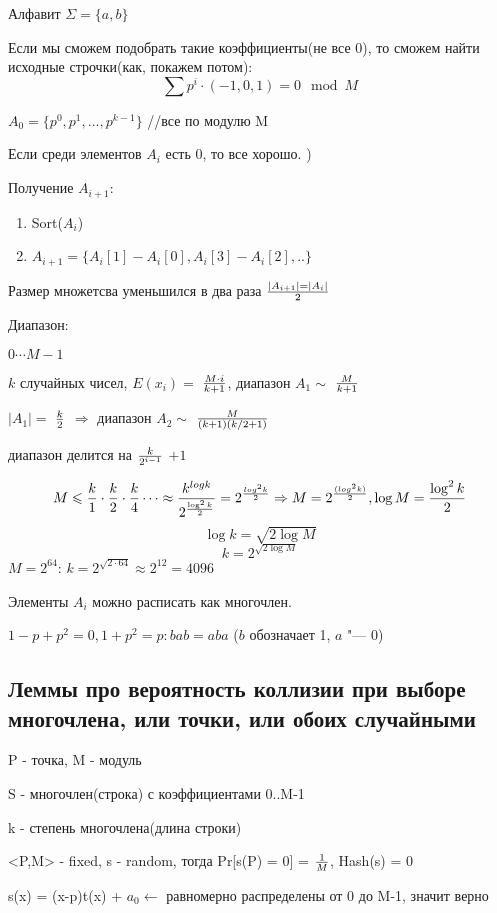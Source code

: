 Алфавит $\Sigma = \{a,b\}$ 

Если мы сможем подобрать такие коэффициенты(не все 0), то сможем найти исходные строчки(как, покажем потом):
$$\sum p^i \cdot (-1,0,1) = 0 \mod M$$

$A_0 = \{p^0, p^1,...,p^{k-1}\}$  //все по модулю M 

Если среди элементов $A_i$ есть 0, то все хорошо. )

Получение $A_{i+1}: $ 
\begin{enumerate} 
 \item Sort($A_i$) 
 \item $A_{i+1} = \{A_i[1]-A_i[0], A_i[3] - A_i[2],..\}$
\end{enumerate}
  
Размер множетсва уменьшился в два раза $|A_{i+1}| = |A_i|\over{2}$

Диапазон:
\begin{description}{
    \item [$A_0$:] $0 \cdots M-1$ 
    \item [$A_1$:] $k$ случайных чисел, $E(x_i)=$ $M \cdot i\over{k+1}$, диапазон $A_1 \sim$  $M\over{k+1}$ 
    \item [$A_2$:] $|A_1| =$ $k\over{2}$ $\Rightarrow$ диапазон $A_2 \sim$ $M\over{(k+1)(k/2 + 1)}$ 
    \item [$A_i$:] диапазон делится на $k\over{2^{i-1}}$ $+ 1$ 
}
\end{description}

$$M \leqslant \frac{k}{1} \cdot \frac{k}{2} \cdot \frac{k}{4} \cdots \approx \frac{k^{log k}}{2^{\frac{\log^2 k}{2}}} =
 2^{\frac{log^2 k}{2}} \Rightarrow M = 2^{({log^2 k})\over{2}}, \log M = \frac{{\log^2 k}}{2}$$
$$\log k = \sqrt{2 \log M}$$
$$k = 2^{\sqrt{2\log M}}$$
$M = 2^{64}$: $k = 2^{\sqrt{2 \cdot 64}} \approx 2^{12} = 4096$ 
\begin{exmp}
Элементы $A_i$ можно расписать как многочлен.

$1 - p + p^2 = 0, 1 + p^2 = p\colon bab = aba$ ($b$ обозначает 1, $a$ "--- 0)
\end{exmp}
\subsection{Леммы
про вероятность коллизии при выборе многочлена, или точки, или обоих случайными} 	

P - точка, M - модуль

S - многочлен(строка) с коэффициентами 0..M-1

k - степень многочлена(длина строки) 
\begin{lemma}{}
 <P,M> - fixed, s - random, тогда Pr[s(P) = 0] = ${1}\over{M}$, Hash(s) = 0

s(x) = (x-p)t(x) + $a_0 \leftarrow$ равномерно распределены от 0 до M-1, значит верно
\end{lemma}

